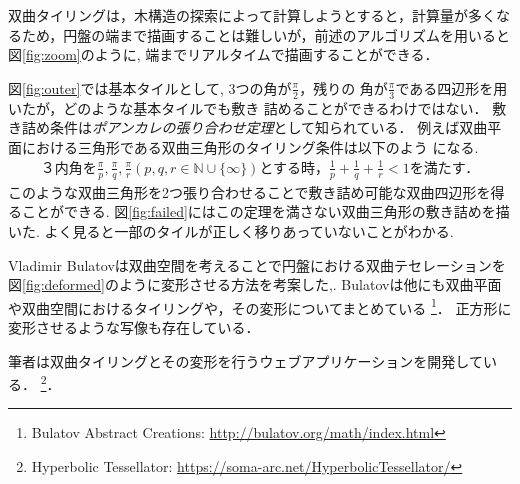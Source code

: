 双曲タイリングは，木構造の探索によって計算しようとすると，計算量が多くな
るため，円盤の端まで描画することは難しいが，前述のアルゴリズムを用いると
図\ref{fig:zoom}のように, 端までリアルタイムで描画することができる．

図\ref{fig:outer}では基本タイルとして, 3つの角が$\frac{\pi}{2}$，残りの
角が$\frac{\pi}{3}$である四辺形を用いたが，どのような基本タイルでも敷き
詰めることができるわけではない．
敷き詰め条件は\emph{ポアンカレの張り合わせ定理}として知られている．
例えば双曲平面における三角形である双曲三角形のタイリング条件は以下のよう
になる.
\begin{eqnarray*}
\text{３内角を}\frac{\pi}{p},\frac{\pi}{q},\frac{\pi}{r} (p, q, r \in
 \mathbb{N} \cup \{\infty\}) \text{とする時，}
 \frac{1}{p} + \frac{1}{q} + \frac{1}{r} < 1 \text{を満たす．}
\end{eqnarray*}
このような双曲三角形を2つ張り合わせることで敷き詰め可能な双曲四辺形を得
ることができる.
図\ref{fig:failed}にはこの定理を満さない双曲三角形の敷き詰めを描いた.
よく見ると一部のタイルが正しく移りあっていないことがわかる.

Vladimir Bulatovは双曲空間を考えることで円盤における双曲テセレーションを
図\ref{fig:deformed}のように変形させる方法を考案した\cite{bridges2013-167},\cite{bridges2011-479}.
Bulatovは他にも双曲平面や双曲空間におけるタイリングや，その変形についてまとめている
\footnote{Bulatov Abstract Creations: \url{http://bulatov.org/math/index.html}}．
正方形に変形させるような写像も存在している\cite{bridges2016-179}．

筆者は双曲タイリングとその変形を行うウェブアプリケーションを開発している．
\footnote{Hyperbolic Tessellator: \url{https://soma-arc.net/HyperbolicTessellator/}}．

